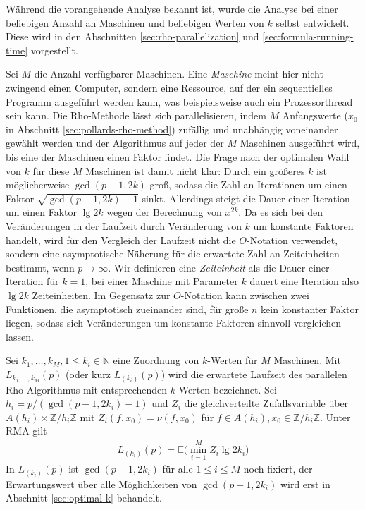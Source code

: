 \documentclass[a4paper, 11pt, ngerman]{article}
\newcommand{\E}{\mathbb{E}}
\newcommand{\N}{\mathbb{N}}
\newcommand{\Z}{\mathbb{Z}}
\theoremstyle{definition}
\theoremstyle{plain}
\theoremstyle{remark}
\begin{document}
Während die vorangehende Analyse bekannt ist, wurde die Analyse bei einer beliebigen Anzahl an Maschinen und beliebigen Werten von $k$ selbst entwickelt. Diese wird in den Abschnitten \ref{sec:rho-parallelization} und \ref{sec:formula-running-time} vorgestellt.

Sei $M$ die Anzahl verfügbarer Maschinen. Eine \emph{Maschine} meint hier nicht zwingend einen Computer, sondern eine Ressource, auf der ein sequentielles Programm ausgeführt werden kann, was beispielsweise auch ein Prozessorthread sein kann. Die Rho-Methode lässt sich parallelisieren, indem $M$ Anfangswerte ($x_0$ in Abschnitt \ref{sec:pollards-rho-method}) zufällig und unabhängig voneinander gewählt werden und der Algorithmus auf jeder der $M$ Maschinen ausgeführt wird, bis eine der Maschinen einen Faktor findet. Die Frage nach der optimalen Wahl von $k$ für diese $M$ Maschinen ist damit nicht klar: Durch ein größeres $k$ ist möglicherweise $\gcd(p - 1, 2k)$ groß, sodass die Zahl an Iterationen um einen Faktor $\sqrt{\gcd(p - 1, 2k) -1}$ sinkt. Allerdings steigt die Dauer einer Iteration um einen Faktor $\lg 2k$ wegen der Berechnung von $x^{2k}$. Da es sich bei den Veränderungen in der Laufzeit durch Veränderung von $k$ um konstante Faktoren handelt, wird für den Vergleich der Laufzeit nicht die $O$-Notation verwendet, sondern eine asymptotische Näherung für die erwartete Zahl an Zeiteinheiten bestimmt, wenn $p \to \infty$. Wir definieren eine \emph{Zeiteinheit} als die Dauer einer Iteration für $k = 1$, bei einer Maschine mit Parameter $k$ dauert eine Iteration also $\lg 2k$ Zeiteinheiten. Im Gegensatz zur $O$-Notation kann zwischen zwei Funktionen, die asymptotisch zueinander sind, für große $n$ kein konstanter Faktor liegen, sodass sich Veränderungen um konstante Faktoren sinnvoll vergleichen lassen.

Sei $k_1, \dots, k_M, 1 \le k_i \in \N$ eine Zuordnung von $k$-Werten für $M$ Maschinen. Mit $L_{k_1, \dots, k_M}(p)$ (oder kurz $L_{(k_i)}(p)$) wird die erwartete Laufzeit des parallelen Rho-Algorithmus mit entsprechenden $k$-Werten bezeichnet. Sei $h_i = p/(\gcd(p - 1, 2k_i) - 1)$ und $Z_i$ die gleichverteilte Zufallsvariable über $A(h_i) \times \Z/h_i\Z$ mit $Z_i(f, x_0) = \nu(f, x_0)$ für $f \in A(h_i), x_0 \in \Z/h_i\Z$. Unter RMA gilt
\begin{align}
    L_{(k_i)}(p) = \E \bigg ( \min_{i = 1}^M Z_i \lg 2k_i \bigg )
    \label{eq:lki-definition}
\end{align}
In $L_{(k_i)}(p)$ ist $\gcd(p - 1, 2k_i)$ für alle $1 \le i \le M$ noch fixiert, der Erwartungswert über alle Möglichkeiten von $\gcd(p - 1, 2k_i)$ wird erst in Abschnitt \ref{sec:optimal-k} behandelt.
\end{document}

